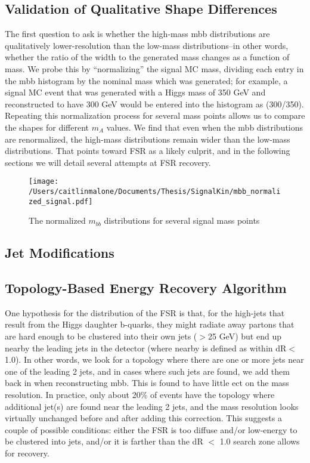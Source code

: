 \subsection{Validation of Qualitative Shape Differences}
The first question to ask is whether the high-mass mbb distributions are qualitatively lower-resolution than
the low-mass distributions–in other words, whether the ratio of the width to the generated mass changes
as a function of mass. We probe this by “normalizing” the signal MC mass, dividing each entry in the mbb
histogram by the nominal mass which was generated; for example, a signal MC event that was generated
with a Higgs mass of 350 GeV and reconstructed to have 300 GeV would be entered into the histogram
as (300/350). Repeating this normalization process for several mass points allows us to compare the
shapes for different $m_A$ values.
We find that even when the mbb distributions are renormalized, the high-mass distributions remain
wider than the low-mass distributions. That points toward FSR as a likely culprit, and in the following
sections we will detail several attempts at FSR recovery.
\begin{figure}[hbt]
  \texttt{[image: /Users/caitlinmalone/Documents/Thesis/SignalKin/mbb\_normalized\_signal.pdf]}
  \label{fig:mbb_norm}
  \caption{The normalized $m_{bb}$ distributions for several signal mass points}
\end{figure}





\subsection{Jet Modifications}
\subsection{Topology-Based Energy Recovery Algorithm}
 One hypothesis for the distribution of the FSR is that, for the high-\pt jets that result from the Higgs
 daughter b-quarks, they might radiate away partons that are hard enough to be clustered into their own
 jets (\pt$>$25 GeV) but end up nearby the leading jets in the detector (where nearby is defined as within
 dR$<$1.0). In other words, we look for a topology where there are one or more jets near one of the leading
2 jets, and in cases where such jets are found, we add them back in when reconstructing mbb.
 This is found to have little ect on the mass resolution. In practice, only about 20\% of events
 have the topology where additional jet(s) are found near the leading 2 jets, and the mass resolution
 looks virtually unchanged before and after adding this correction. This suggests a couple of possible
 conditions: either the FSR is too diffuse and/or low-energy to be clustered into jets, and/or it is farther
 than the dR $<$ 1.0 search zone allows for recovery. 
    

